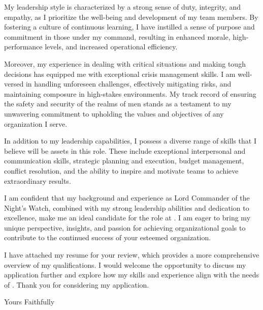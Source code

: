 \documentclass[11pt,a4]{article}
\begin{document}
My leadership style is characterized by a strong sense of duty, integrity, and empathy, as I prioritize the well-being and development of my team members. By fostering a culture of continuous learning, I have instilled a sense of purpose and commitment in those under my command, resulting in enhanced morale, high-performance levels, and increased operational efficiency.

Moreover, my experience in dealing with critical situations and making tough decisions has equipped me with exceptional crisis management skills. I am well-versed in handling unforeseen challenges, effectively mitigating risks, and maintaining composure in high-stakes environments. My track record of ensuring the safety and security of the realms of men stands as a testament to my unwavering commitment to upholding the values and objectives of any organization I serve.
\par

In addition to my leadership capabilities, I possess a diverse range of skills that I believe will be assets in this role. These include exceptional interpersonal and communication skills, strategic planning and execution, budget management, conflict resolution, and the ability to inspire and motivate teams to achieve extraordinary results.
\par

I am confident that my background and experience as Lord Commander of the Night's Watch, combined with my strong leadership abilities and dedication to excellence, make me an ideal candidate for the \position{} role at \company{}. I am eager to bring my unique perspective, insights, and passion for achieving organizational goals to contribute to the continued success of your esteemed organization.
\par

I have attached my resume for your review, which provides a more comprehensive overview of my qualifications. I would welcome the opportunity to discuss my application further and explore how my skills and experience align with the needs of \company{}. Thank you for considering my application.

\vspace{0.5cm}
\raggedright
Yours Faithfully \\ \name \\ \phone \\ \href{mailto:\email}{\email}
\end{document}
